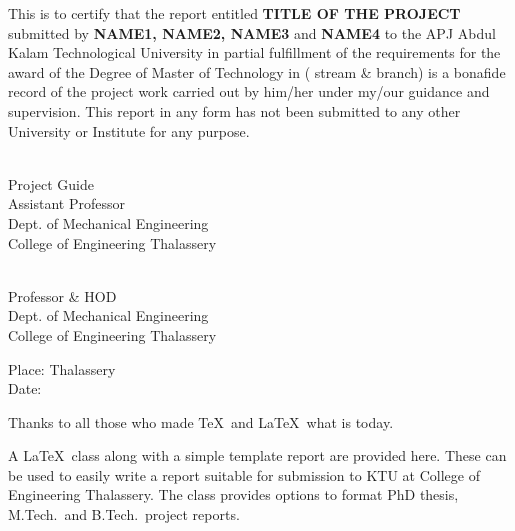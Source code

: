 \documentclass[BTech]{cetlyproj}
\begin{document}
\noindent This is to certify that the report entitled {\large \bf TITLE OF THE PROJECT} submitted by {\bf NAME1, NAME2, NAME3} and {\bf NAME4} to the APJ Abdul Kalam Technological University in partial fulfillment of the requirements for the award of the Degree of Master of Technology in ( stream \& branch) is a bonafide record of the project work carried out by him/her under my/our guidance and supervision. This report in any form has not been submitted to any
other University or Institute for any purpose.

\vspace*{1.0in}

\begin{singlespacing}
\hspace*{-0.25in}
\parbox{2.5in}{
 \\
\noindent Project Guide \\ 
\noindent Assistant Professor \\
\noindent Dept. of Mechanical Engineering\\
\noindent College of Engineering Thalassery \\
} 
\hspace*{0.7in} 
\parbox{2.5in}{
 \\
\noindent Professor \& HOD \\ 
\noindent Dept. of Mechanical Engineering\\
\noindent College of Engineering Thalassery \\
}  
\end{singlespacing}
\vspace*{0.25in}

\noindent Place: Thalassery\\
Date: 


\acknowledgements

Thanks to all those who made \TeX\ and \LaTeX\ what is today.


\abstract


\vspace*{24pt}

\noindent A \LaTeX\ class along with a simple template report are
provided here.  These can be used to easily write a report suitable
for submission to KTU at College of Engineering Thalassery.  The class provides options to format PhD thesis, M.Tech.\ and B.Tech.\ project reports. 
\end{document}
